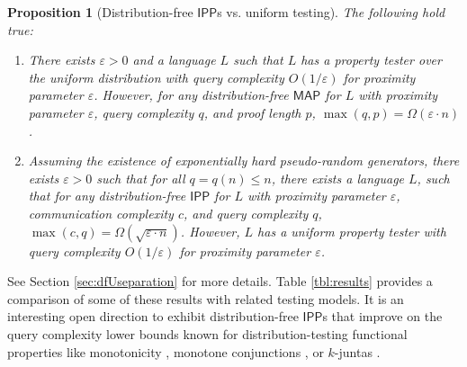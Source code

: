 \documentclass[11pt]{article}
\newtheorem{proposition}[theorem]{Proposition}
\newcommand{\IPP}{\mathsf{IPP}}
\newcommand{\MAP}{\mathsf{MAP}}
\newcommand{\eps}{\varepsilon}
\begin{document}
\begin{proposition}[Distribution-free $\IPP$s vs. uniform testing]
\label{prop:seps}
    The following hold true:
    \begin{enumerate}
        \item There exists $\varepsilon>0$ and a language $L$ such that $L$ has a property tester over the uniform distribution with query complexity $O(1/\varepsilon)$ for proximity parameter $\varepsilon$. However, for any distribution-free $\MAP$ for $L$ with proximity parameter $\eps$, query complexity $q$, and proof length $p$, $\max(q,p)=\Omega(\varepsilon\cdot n)$. 
        
        \item Assuming the existence of exponentially hard pseudo-random generators, there exists $\varepsilon>0$ such that for all $q=q(n)\leq n$, there exists a language $L$, such that for any distribution-free $\IPP$ for $L$ with proximity parameter $\eps$, communication complexity $c$, and query complexity $q$, $\max(c,q)=\Omega(\sqrt{\varepsilon\cdot n})$. 
        However, $L$ has a uniform property tester with query complexity $O(1/\varepsilon)$ for proximity parameter $\eps$.
        \end{enumerate}
\end{proposition}

See Section \ref{sec:dfUseparation} for more details. Table \ref{tbl:results} provides a comparison of some of these results with related testing models. It is an interesting open direction to exhibit distribution-free $\IPP$s that improve on the query complexity lower bounds known for distribution-testing functional properties like monotonicity \cite{HalKush}, monotone conjunctions \cite{ChenXie}, or $k$-juntas \cite{Junta}.
\end{document}
